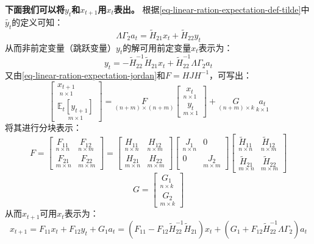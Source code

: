 \textbf{下面我们可以将$y_t$和$x_{t+1}$用$x_t$表出。}
根据\cref{eq-linear-ration-expectation-def-tilde}中$\tilde{y_t}$的定义可知：
\begin{equation*}
    \Lambda \Gamma_2 a_t = \tilde{H}_{21}x_t + \tilde{H}_{22}y_t
\end{equation*}
从而非前定变量（跳跃变量）$y_t$的解可用前定变量$x_t$表示为：
\begin{equation}    \label{eq-linear-rational-expectation-solution-y}
    y_t=-\tilde{H}_{22}^{-1} \tilde{H}_{21} x_t+\tilde{H}_{22}^{-1} \Lambda \Gamma_2 a_t
\end{equation}
又由\cref{eq-linear-ration-expectation-jordan}和$F=HJH^{-1}$，可写出：
\begin{equation*}
    \begin{bmatrix}
        \underset{n\times 1}{x_{t+1}} \\
        \underset{m\times 1}{\mathbb{E}_t\left[y_{t+1}\right]}
    \end{bmatrix}
    =
    \underset{(n+m)\times (n+m)}{F}
    \begin{bmatrix}
        \underset{n\times 1}{x_t} \\
        \underset{m\times 1}{y_t}
    \end{bmatrix}
    + \underset{(n+m)\times k}{G} ~ \underset{k\times 1}{a_t}
\end{equation*}
将其进行分块表示：
\[
    F = 
    \begin{bmatrix}
        \underset{n\times n}{F_{11}} & \underset{n\times m}{F_{12}} \\
        \underset{m\times n}{F_{21}} & \underset{m\times m}{F_{22}}
    \end{bmatrix}
    =
    \begin{bmatrix}
       \underset{n\times n}{H_{11}} & \underset{n\times m}{H_{12}} \\
       \underset{m\times n}{H_{21}} & \underset{m\times m}{H_{22}}
    \end{bmatrix}
    \begin{bmatrix}
       \underset{n\times n}{J_1} & 0 \\
       0 & \underset{m\times m}{J_2} 
    \end{bmatrix}
    \begin{bmatrix}
       \underset{n\times n}{\tilde{H}_{11}} & \underset{n\times m}{\tilde{H}_{12}} \\
       \underset{m\times n}{\tilde{H}_{21}} & \underset{m\times m}{\tilde{H}_{22}}
    \end{bmatrix}
\]
\[
    G = 
    \begin{bmatrix}
        \underset{n\times k}{G_1} \\ 
        \underset{m\times k}{G_2}
    \end{bmatrix}
\]
从而$x_{t+1}$可用$x_t$表示为：
\begin{equation}   \label{eq-linear-rational-expectation-solution-xprime}
    x_{t+1} = F_{11} x_t+F_{12} y_t+G_1 a_t
        = \left(F_{11}-F_{12} \tilde{H}_{22}^{-1} \tilde{H}_{21}\right) x_t + 
            \left(G_1+F_{12} \tilde{H}_{22}^{-1} \Lambda \Gamma_2\right) a_t
\end{equation}

